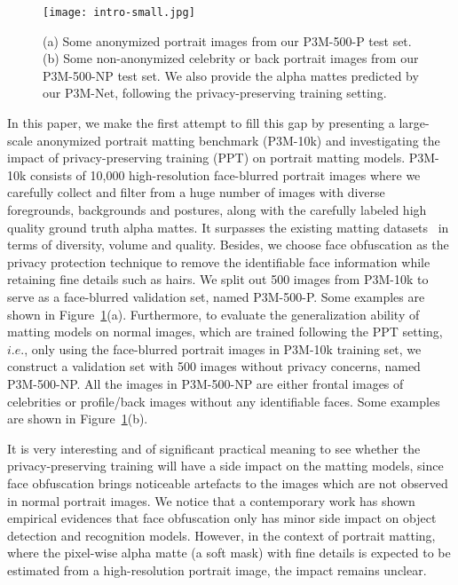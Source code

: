 \documentclass[sigconf]{acmart}
\begin{document}
\begin{figure}[t]
    \centering
    \texttt{[image: intro-small.jpg]}
    \caption{(a) Some anonymized portrait images from our P3M-500-P test set. (b) Some non-anonymized celebrity or back portrait images from our P3M-500-NP test set. We also provide the alpha mattes predicted by our P3M-Net, following the privacy-preserving training setting.}
    \label{fig:introduction}
\end{figure}

In this paper, we make the first attempt to fill this gap by presenting a large-scale anonymized portrait matting benchmark (P3M-10k) and investigating the impact of privacy-preserving training (PPT) on portrait matting models. P3M-10k consists of 10,000 high-resolution face-blurred portrait images where we carefully collect and filter from a huge number of images with diverse foregrounds, backgrounds and postures, along with the carefully labeled high quality ground truth alpha mattes. It surpasses the existing matting datasets~\cite{dapm,hatt,lf} in terms of diversity, volume and quality. Besides, we choose face obfuscation as the privacy protection technique to remove the identifiable face information while retaining fine details such as hairs. We split out 500 images from P3M-10k to serve as a face-blurred validation set, named P3M-500-P. Some examples are shown in Figure~\ref{fig:introduction}(a). Furthermore, to evaluate the generalization ability of matting models on normal images, which are trained following the PPT setting, $i.e.$, only using the face-blurred portrait images in P3M-10k training set, we construct a validation set with 500 images without privacy concerns, named P3M-500-NP. All the images in P3M-500-NP are either frontal images of celebrities or profile/back images without any identifiable faces. Some examples are shown in Figure~\ref{fig:introduction}(b).

It is very interesting and of significant practical meaning to see whether the privacy-preserving training will have a side impact on the matting models, since face obfuscation brings noticeable artefacts to the images which are not observed in normal portrait images. We notice that a contemporary work \cite{yang2021study} has shown empirical evidences that face obfuscation only has minor side impact on object detection and recognition models. However, in the context of portrait matting, where the pixel-wise alpha matte (a soft mask) with fine details is expected to be estimated from a high-resolution portrait image, the impact remains unclear.
\end{document}
